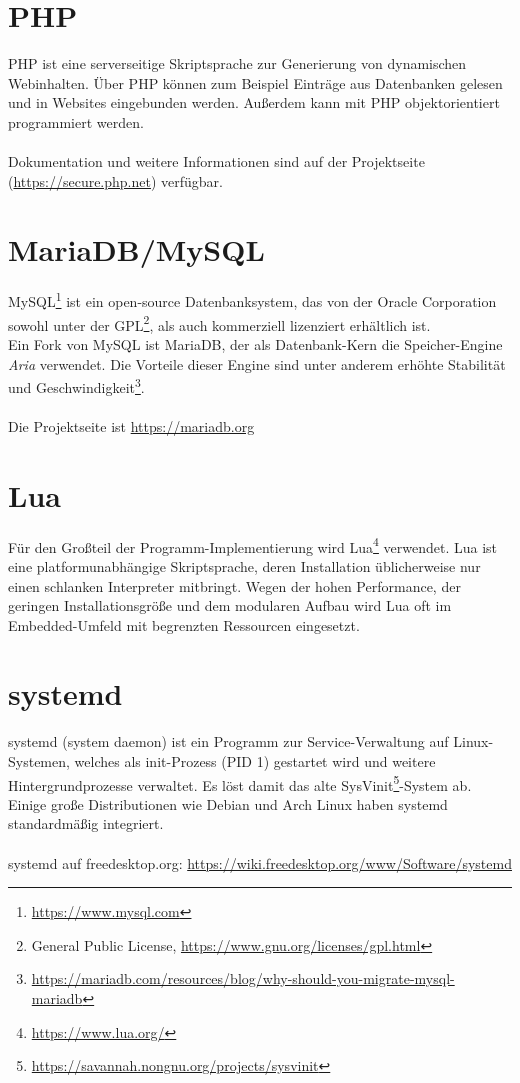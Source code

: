 \section{PHP}
PHP ist eine serverseitige Skriptsprache zur Generierung von dynamischen Webinhalten. Über PHP können zum Beispiel Einträge aus  Datenbanken gelesen und in Websites eingebunden werden. Außerdem kann mit PHP objektorientiert programmiert werden.\\
\\
Dokumentation und weitere Informationen sind auf der Projektseite (\url{https://secure.php.net}) verfügbar.
\vspace{1.0cm}



\section{MariaDB/MySQL}
MySQL\footnote{\url{https://www.mysql.com}} ist ein open-source Datenbanksystem, das von der Oracle Corporation sowohl unter der GPL\footnote{General Public License, \url{https://www.gnu.org/licenses/gpl.html}}, als auch kommerziell lizenziert erhältlich ist.\\
Ein Fork von MySQL ist MariaDB, der als Datenbank-Kern die Speicher-Engine \textit{Aria} verwendet. Die Vorteile dieser Engine sind unter anderem erhöhte Stabilität und Geschwindigkeit\footnote{\url{https://mariadb.com/resources/blog/why-should-you-migrate-mysql-mariadb}}.\\
\\
Die Projektseite ist \url{https://mariadb.org}
\vspace{1.0cm}


\section{Lua}
Für den Großteil der Programm-Implementierung wird Lua\footnote{\url{https://www.lua.org/}} verwendet.
Lua ist eine platformunabhängige Skriptsprache, deren Installation üblicherweise nur einen schlanken Interpreter mitbringt. Wegen der hohen Performance, der geringen Installationsgröße und dem modularen Aufbau wird Lua oft im Embedded-Umfeld mit begrenzten Ressourcen eingesetzt.
\vspace{1.0cm}

\section{systemd}
systemd (system daemon) ist ein Programm zur Service-Verwaltung auf Linux-Systemen, welches als init-Prozess (PID 1) gestartet wird und weitere Hintergrundprozesse verwaltet. Es löst damit das alte SysVinit\footnote{\url{https://savannah.nongnu.org/projects/sysvinit}}-System ab. Einige große Distributionen wie Debian und Arch Linux haben systemd standardmäßig integriert.\\
\\
systemd auf freedesktop.org: \url{https://wiki.freedesktop.org/www/Software/systemd}
\newpage
